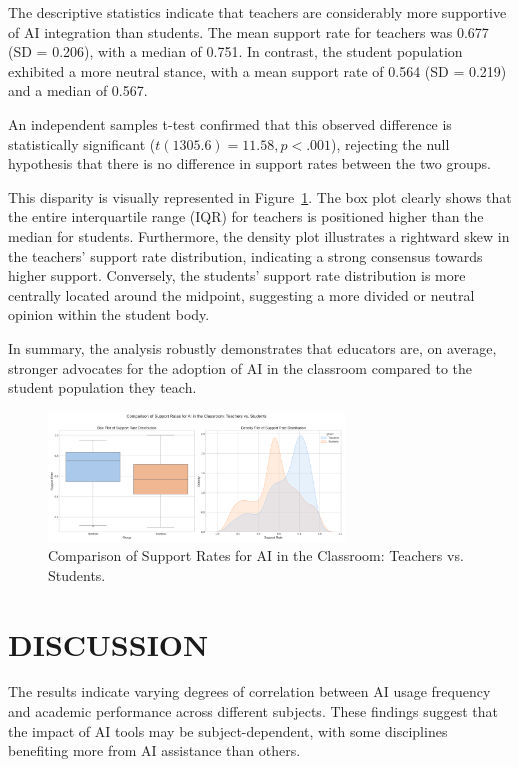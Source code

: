 \documentclass[manuscript,screen,review]{acmart}
\begin{document}
The descriptive statistics indicate that teachers are considerably more supportive of AI integration than students. The mean support rate for teachers was 0.677 (SD = 0.206), with a median of 0.751. In contrast, the student population exhibited a more neutral stance, with a mean support rate of 0.564 (SD = 0.219) and a median of 0.567.

An independent samples t-test confirmed that this observed difference is statistically significant ($t(1305.6) = 11.58, p < .001$), rejecting the null hypothesis that there is no difference in support rates between the two groups.

This disparity is visually represented in Figure~\ref{fig:support_rate_comparison}. The box plot clearly shows that the entire interquartile range (IQR) for teachers is positioned higher than the median for students. Furthermore, the density plot illustrates a rightward skew in the teachers' support rate distribution, indicating a strong consensus towards higher support. Conversely, the students' support rate distribution is more centrally located around the midpoint, suggesting a more divided or neutral opinion within the student body.

In summary, the analysis robustly demonstrates that educators are, on average, stronger advocates for the adoption of AI in the classroom compared to the student population they teach.

\begin{figure}[H]
\centering
\includegraphics[width=0.7\textwidth]{../results/support_rate_comparison.png}
\caption{Comparison of Support Rates for AI in the Classroom: Teachers vs. Students.}
\label{fig:support_rate_comparison}
\end{figure}

\section{DISCUSSION}

The results indicate varying degrees of correlation between AI usage frequency and academic performance across different subjects. These findings suggest that the impact of AI tools may be subject-dependent, with some disciplines benefiting more from AI assistance than others.
\end{document}
